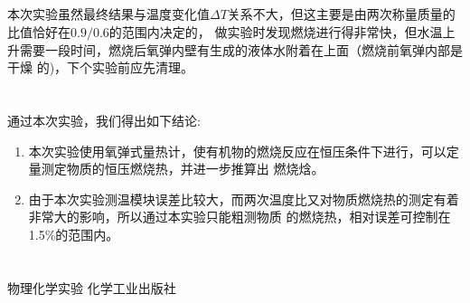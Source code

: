 ﻿\documentclass[10.5pt]{ctexart}
\begin{document}
\subsection{\textbf{}}
本次实验虽然最终结果与温度变化值$\Delta T$关系不大，但这主要是由两次称量质量的比值恰好在$0.9/0.6$的范围内决定的，
做实验时发现燃烧进行得非常快，但水温上升需要一段时间，燃烧后氧弹内壁有生成的液体水附着在上面（燃烧前氧弹内部是干燥
的)，下个实验前应先清理。

\section{\textbf{}}

通过本次实验，我们得出如下结论:
\begin{enumerate}
\item 本次实验使用氧弹式量热计，使有机物的燃烧反应在恒压条件下进行，可以定量测定物质的恒压燃烧热，并进一步推算出
燃烧焓。
\item 由于本次实验测温模块误差比较大，而两次温度比又对物质燃烧热的测定有着非常大的影响，所以通过本实验只能粗测物质
的燃烧热，相对误差可控制在1.5\%的范围内。
\end{enumerate}

\section{\textbf{}}
\begin{thebibliography}{}
物理化学实验 \quad 化学工业出版社
\end{thebibliography}
\end{document}
